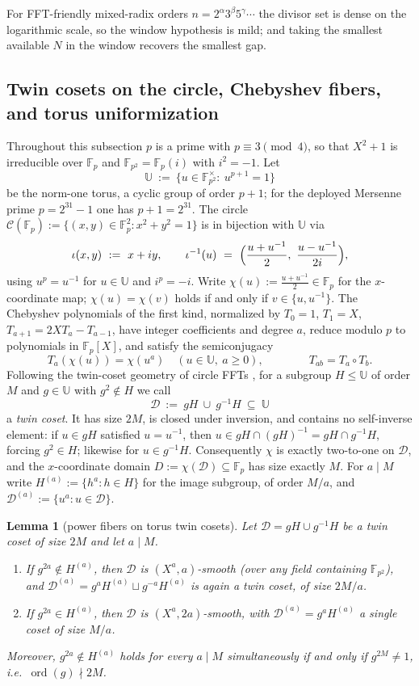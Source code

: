 \documentclass[11pt]{article}
\newtheorem{lemma}[lemma]{Lemma}
\theoremstyle{definition}
\theoremstyle{remark}
\newcommand{\F}{\mathbb{F}}
\newcommand{\UU}{\mathbb{U}}
\begin{document}
For FFT-friendly mixed-radix orders $n=2^{\alpha}3^{\beta}5^{\gamma}\cdots$ the divisor set is dense on the logarithmic scale, so the window hypothesis is mild; and taking the smallest available $N$ in the window recovers the smallest gap.

\subsection{Twin cosets on the circle, Chebyshev fibers, and torus uniformization}
\label{sec:circle-geometry}

Throughout this subsection $p$ is a prime with $p\equiv3\pmod4$, so that $X^2+1$ is irreducible over $\F_p$ and $\F_{p^2}=\F_p(i)$ with $i^2=-1$. Let
\[
\UU\ :=\ \{u\in\F_{p^2}^{\times}:\ u^{p+1}=1\}
\]
be the norm-one torus, a cyclic group of order $p+1$; for the deployed Mersenne prime $p=2^{31}-1$ one has $p+1=2^{31}$. The circle $\mathcal C(\F_p):=\{(x,y)\in\F_p^2:x^2+y^2=1\}$ is in bijection with $\UU$ via
\[
\iota(x,y)\ :=\ x+iy,
\qquad
\iota^{-1}(u)\ =\ \Bigl(\frac{u+u^{-1}}2,\ \frac{u-u^{-1}}{2i}\Bigr),
\]
using $u^p=u^{-1}$ for $u\in\UU$ and $i^p=-i$. Write $\chi(u):=\frac{u+u^{-1}}2\in\F_p$ for the $x$-coordinate map; $\chi(u)=\chi(v)$ holds if and only if $v\in\{u,u^{-1}\}$. The Chebyshev polynomials of the first kind, normalized by $T_0=1$, $T_1=X$, $T_{a+1}=2XT_a-T_{a-1}$, have integer coefficients and degree $a$, reduce modulo $p$ to polynomials in $\F_p[X]$, and satisfy the semiconjugacy
\[
T_a(\chi(u))=\chi(u^a)\quad(u\in\UU,\ a\ge0),
\qquad\qquad
T_{ab}=T_a\circ T_b .
\]
Following the twin-coset geometry of circle FFTs \cite{HLP24}, for a subgroup $H\le\UU$ of order $M$ and $g\in\UU$ with $g^2\notin H$ we call
\[
\mathcal D\ :=\ gH\ \cup\ g^{-1}H\ \subseteq\ \UU
\]
a \emph{twin coset}. It has size $2M$, is closed under inversion, and contains no self-inverse element: if $u\in gH$ satisfied $u=u^{-1}$, then $u\in gH\cap(gH)^{-1}=gH\cap g^{-1}H$, forcing $g^2\in H$; likewise for $u\in g^{-1}H$. Consequently $\chi$ is exactly two-to-one on $\mathcal D$, and the $x$-coordinate domain $D:=\chi(\mathcal D)\subseteq\F_p$ has size exactly $M$. For $a\mid M$ write $H^{(a)}:=\{h^a:h\in H\}$ for the image subgroup, of order $M/a$, and $\mathcal D^{(a)}:=\{u^a:u\in\mathcal D\}$.

\begin{lemma}[power fibers on torus twin cosets]\label{lem:torus-fibers}
Let $\mathcal D=gH\cup g^{-1}H$ be a twin coset of size $2M$ and let $a\mid M$.
\begin{enumerate}[label=\textup{(\alph*)}]
\item If $g^{2a}\notin H^{(a)}$, then $\mathcal D$ is $(X^a,a)$-smooth \textup(over any field containing $\F_{p^2}$\textup), and $\mathcal D^{(a)}=g^aH^{(a)}\sqcup g^{-a}H^{(a)}$ is again a twin coset, of size $2M/a$.
\item If $g^{2a}\in H^{(a)}$, then $\mathcal D$ is $(X^a,2a)$-smooth, with $\mathcal D^{(a)}=g^aH^{(a)}$ a single coset of size $M/a$.
\end{enumerate}
Moreover, $g^{2a}\notin H^{(a)}$ holds for every $a\mid M$ simultaneously if and only if $g^{2M}\ne1$, i.e.\ $\operatorname{ord}(g)\nmid2M$.
\end{lemma}
\end{document}
